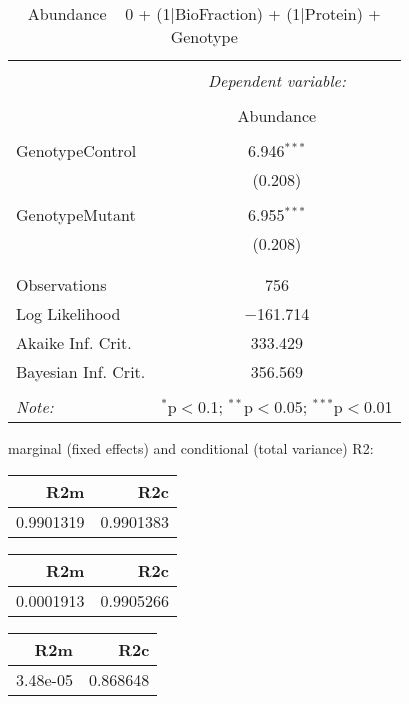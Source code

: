 \documentclass[11pt]{report}
\begin{document}
\begin{table}[!htbp] \centering 
  \caption{Abundance ~ 0 + (1|BioFraction) + (1|Protein) + Genotype} 
  \label{} 
\begin{tabular}{@{\extracolsep{5pt}}lc} 
\\[-1.8ex]\hline 
\hline \\[-1.8ex] 
 & \multicolumn{1}{c}{\textit{Dependent variable:}} \\ 
\cline{2-2} 
\\[-1.8ex] & Abundance \\ 
\hline \\[-1.8ex] 
 GenotypeControl & 6.946$^{***}$ \\ 
  & (0.208) \\ 
  & \\ 
 GenotypeMutant & 6.955$^{***}$ \\ 
  & (0.208) \\ 
  & \\ 
\hline \\[-1.8ex] 
Observations & 756 \\ 
Log Likelihood & $-$161.714 \\ 
Akaike Inf. Crit. & 333.429 \\ 
Bayesian Inf. Crit. & 356.569 \\ 
\hline 
\hline \\[-1.8ex] 
\textit{Note:}  & \multicolumn{1}{r}{$^{*}$p$<$0.1; $^{**}$p$<$0.05; $^{***}$p$<$0.01} \\ 
\end{tabular} 
\end{table} 
marginal (fixed effects) and conditional (total variance) R2:

\begin{tabular}{r|r}
\hline
R2m & R2c\\
\hline
0.9901319 & 0.9901383\\
\hline
\end{tabular}

\begin{tabular}{r|r}
\hline
R2m & R2c\\
\hline
0.0001913 & 0.9905266\\
\hline
\end{tabular}

\begin{tabular}{r|r}
\hline
R2m & R2c\\
\hline
3.48e-05 & 0.868648\\
\hline
\end{tabular}
\end{document}
